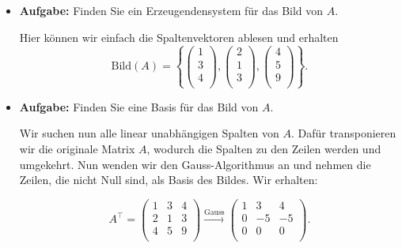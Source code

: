 \begin{itemize}
    \item \textbf{Aufgabe:} Finden Sie ein Erzeugendensystem für das Bild von \( A \).
    
    Hier können wir einfach die Spaltenvektoren ablesen und erhalten
    \begin{equation*}
        \text{Bild}(A)=\left\{ \begin{pmatrix} 1 \\ 3 \\ 4 \\ \end{pmatrix}, \begin{pmatrix} 2 \\ 1 \\ 3 \\ \end{pmatrix}, \begin{pmatrix} 4 \\ 5 \\ 9 \\ \end{pmatrix} \right\}.
    \end{equation*}

    \item \textbf{Aufgabe:} Finden Sie eine Basis für das Bild von \( A \).
    
    Wir suchen nun alle linear unabhängigen Spalten von \( A \). Dafür transponieren wir die originale Matrix \( A \), wodurch die Spalten zu den Zeilen werden und umgekehrt. Nun wenden wir den Gauss-Algorithmus an und nehmen die Zeilen, die nicht Null sind, als Basis des Bildes. Wir erhalten:

    \begin{equation*}
        A^\top =
        \begin{pmatrix}
            1 & 3 & 4 \\
            2 & 1 & 3 \\
            4 & 5 & 9 \\
        \end{pmatrix} \xrightarrow{\text{Gauss}} \begin{pmatrix}
            1 & 3 & 4 \\
            0 & -5 & -5 \\
            0 & 0 & 0 \\
        \end{pmatrix}.
    \end{equation*}

    \vspace{0.25\baselineskip}


\end{itemize}
